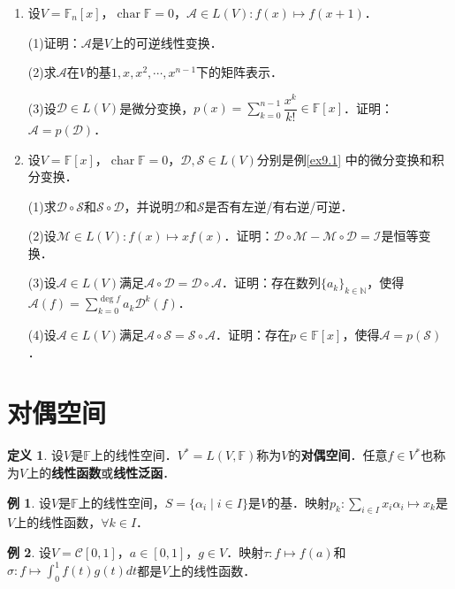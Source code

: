 \documentclass[a4paper,fontset=windows]{ctexbook}
\theoremstyle{definition}
\newtheorem{definition}{定义}[chapter]
\newtheorem{example}{例}[chapter]
\DeclareMathOperator{\Char}{char}
\begin{document}
\begin{enumerate}
(2) $\mathcal{A}$是单射$\Leftrightarrow\mathcal{A}$是满射$\Leftrightarrow\mathcal{A}$可逆．

(3)当$V$是无限维时，(1)和(2)是否仍然成立？证明你的结论．

\item 设$V=\mathbb{F}_n[x]$，$\Char\mathbb{F}=0$，$\mathcal{A}\in L(V):f(x)\mapsto f(x+1)$．

(1)证明：$\mathcal{A}$是$V$上的可逆线性变换．

(2)求$\mathcal{A}$在$V$的基$1,x,x^2,\cdots,x^{n-1}$下的矩阵表示．

(3)设$\mathcal{D}\in L(V)$是微分变换，$p(x)=\sum\limits_{k=0}^{n-1}\dfrac{x^k}{k!}\in\mathbb{F}[x]$．证明：$\mathcal{A}=p(\mathcal{D})$．

\item 设$V=\mathbb{F}[x]$，$\Char\mathbb{F}=0$，$\mathcal{D,S}\in L(V)$分别是例\ref{ex9.1} 中的微分变换和积分变换．

(1)求$\mathcal{D\circ S}$和$\mathcal{S\circ D}$，并说明$\mathcal{D}$和$\mathcal{S}$是否有左逆/有右逆/可逆．

(2)设$\mathcal{M}\in L(V):f(x)\mapsto xf(x)$．证明：$\mathcal{D\circ M-M\circ D=I}$是恒等变换．

(3)设$\mathcal{A}\in L(V)$满足$\mathcal{A\circ D=D\circ A}$．证明：存在数列$\{a_k\}_{k\in\mathbb{N}}$，使得$\mathcal{A}(f)=\sum\limits_{k=0}^{\deg f}a_k\mathcal{D}^k(f)$．

(4)设$\mathcal{A}\in L(V)$满足$\mathcal{A\circ S=S\circ A}$．证明：存在$p\in\mathbb{F}[x]$，使得$\mathcal{A}=p(\mathcal{S})$．

\end{enumerate}

\clearpage\section{对偶空间}

\begin{definition}
设$V$是$\mathbb{F}$上的线性空间．$V^*=L(V,\mathbb{F})$称为$V$的{\bf 对偶空间}．任意$f\in V^*$也称为$V$上的{\bf 线性函数}或{\bf 线性泛函}．
\end{definition}

\begin{example}
设$V$是$\mathbb{F}$上的线性空间，$S=\{\alpha_i\mid i\in I\}$是$V$的基．映射$p_k:\sum\limits_{i\in I}x_i\alpha_i\mapsto x_k$是$V$上的线性函数，$\forall k\in I$．
\end{example}

\begin{example}
设$V=\mathscr{C}[0,1]$，$a\in[0,1]$，$g\in V$．映射$\mathcal{\tau}:f\mapsto f(a)$和$\sigma:f\mapsto\int_0^1f(t)g(t)dt$都是$V$上的线性函数．
\end{example}
\end{document}
